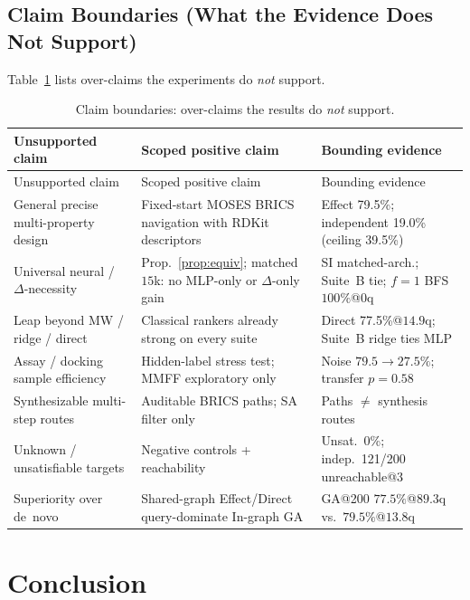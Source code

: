 \subsection{Claim Boundaries (What the Evidence Does Not Support)}
\label{sec:claims}

Table~\ref{tab:claims} lists over-claims the experiments do \emph{not} support.

{\footnotesize
\setlength{\tabcolsep}{3pt}
\begin{longtable}{@{}>{\raggedright\arraybackslash}p{}>{\raggedright\arraybackslash}p{}>{\raggedright\arraybackslash}p{}@{}}
\caption{Claim boundaries: over-claims the results do \emph{not} support.}
\label{tab:claims}\\
\toprule
Unsupported claim & Scoped positive claim & Bounding evidence \\
\midrule
\endfirsthead
\toprule
Unsupported claim & Scoped positive claim & Bounding evidence \\
\midrule
\endhead
\bottomrule
\endlastfoot
General precise multi-property design &
Fixed-start MOSES BRICS navigation with RDKit descriptors &
Effect 79.5\%; independent 19.0\% (ceiling 39.5\%) \\
Universal neural / $\Delta$-necessity &
Prop.~\ref{prop:equiv}; matched $15$k: no MLP-only or $\Delta$-only gain &
SI matched-arch.; Suite~B tie; $f{=}1$ BFS $100\%$@$0$q \\
Leap beyond MW / ridge / direct &
Classical rankers already strong on every suite &
Direct 77.5\%@$14.9$q; Suite~B ridge ties MLP \\
Assay / docking sample efficiency &
Hidden-label stress test; MMFF exploratory only &
Noise $79.5{\to}27.5\%$; transfer $p{=}0.58$ \\
Synthesizable multi-step routes &
Auditable BRICS paths; SA filter only &
Paths $\neq$ synthesis routes \\
Unknown / unsatisfiable targets &
Negative controls + reachability &
Unsat.\ 0\%; indep.\ 121/200 unreachable@3 \\
Superiority over de~novo &
Shared-graph Effect/Direct query-dominate In-graph GA &
GA@200 $77.5\%$@$89.3$q vs.\ $79.5\%$@$13.8$q \\
\end{longtable}
}
\FloatBarrier

\section{Conclusion}

